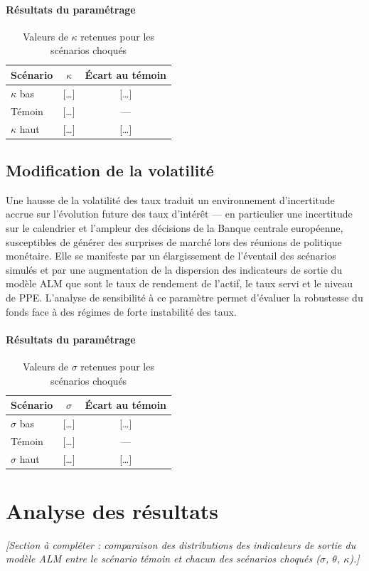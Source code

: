 \paragraph{Résultats du paramétrage}

\begin{table}[H]
    \centering
    \caption{Valeurs de $\kappa$ retenues pour les scénarios choqués}
    \label{tab:scenarios_kappa}
    \begin{tabular}{|l|c|c|}
        \hline
        \textbf{Scénario} & \textbf{$\kappa$} & \textbf{Écart au témoin} \\
        \hline
        $\kappa$ bas  & {[\ldots]} & {[\ldots]} \\
        Témoin        & {[\ldots]} & ---        \\
        $\kappa$ haut & {[\ldots]} & {[\ldots]} \\
        \hline
    \end{tabular}
\end{table}

\subsection{Modification de la volatilité}

Une hausse de la volatilité des taux traduit un environnement d'incertitude accrue sur l'évolution future des taux d'intérêt — en particulier une incertitude sur le calendrier et l'ampleur des décisions de la Banque centrale européenne, susceptibles de générer des surprises de marché lors des réunions de politique monétaire. Elle se manifeste par un élargissement de l'éventail des scénarios simulés et par une augmentation de la dispersion des indicateurs de sortie du modèle ALM que sont le taux de rendement de l'actif, le taux servi et le niveau de PPE. L'analyse de sensibilité à ce paramètre permet d'évaluer la robustesse du fonds face à des régimes de forte instabilité des taux.

\paragraph{Résultats du paramétrage}

\begin{table}[H]
    \centering
    \caption{Valeurs de $\sigma$ retenues pour les scénarios choqués}
    \label{tab:scenarios_sigma}
    \begin{tabular}{|l|c|c|}
        \hline
        \textbf{Scénario} & \textbf{$\sigma$} & \textbf{Écart au témoin} \\
        \hline
        $\sigma$ bas  & {[\ldots]} & {[\ldots]} \\
        Témoin        & {[\ldots]} & ---        \\
        $\sigma$ haut & {[\ldots]} & {[\ldots]} \\
        \hline
    \end{tabular}
\end{table}

\section{Analyse des résultats}

\textit{[Section à compléter : comparaison des distributions des indicateurs de sortie du modèle ALM entre le scénario témoin et chacun des scénarios choqués ($\sigma$, $\theta$, $\kappa$).]}
